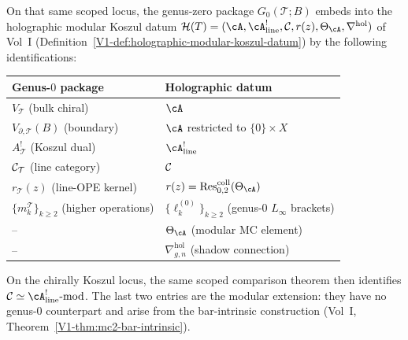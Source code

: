 \begin{construction}
On that same scoped locus, the genus-zero package
$G_0(\mathcal T;B)$ embeds into the
holographic modular Koszul datum
$\mathcal H(T)=(\cA,\cA^!_{\mathrm{line}},\cC,r(z),\Theta_\cA,
\nabla^{\mathrm{hol}})$
of Vol~I (Definition~\ref*{V1-def:holographic-modular-koszul-datum})
by the following identifications:
\begin{center}
\renewcommand{\arraystretch}{1.15}
\begin{tabular}{ll}
\textbf{Genus-$0$ package} & \textbf{Holographic datum} \\
\hline
$V_\mathcal T$ (bulk chiral)
 & $\cA$ \\
$V_{\partial,\mathcal T}(B)$ (boundary)
 & $\cA$ restricted to $\{0\}\times X$ \\
$A^!_\mathcal T$ (Koszul dual)
 & $\cA^!_{\mathrm{line}}$ \\
$\mathcal C_\mathcal T$ (line category)
 & $\mathcal C$ \\
$r_\mathcal T(z)$ (line-OPE kernel)
 & $r(z)=\operatorname{Res}^{\mathrm{coll}}_{0,2}(\Theta_\cA)$ \\
$\{m_k^\mathcal T\}_{k\ge 2}$ (higher operations)
 & $\{\ell_k^{(0)}\}_{k\ge 2}$ (genus-$0$ $L_\infty$ brackets) \\
-- & $\Theta_\cA$ (modular MC element) \\
-- & $\nabla^{\mathrm{hol}}_{g,n}$ (shadow connection)
\end{tabular}
\end{center}
On the chirally Koszul locus, the same scoped comparison theorem
then identifies $\cC\simeq\cA^!_{\mathrm{line}}\text{-mod}$.
The last two entries are the modular extension: they have no
genus-$0$ counterpart and arise from the bar-intrinsic
construction (Vol~I,
Theorem~\ref*{V1-thm:mc2-bar-intrinsic}).


\end{construction}
